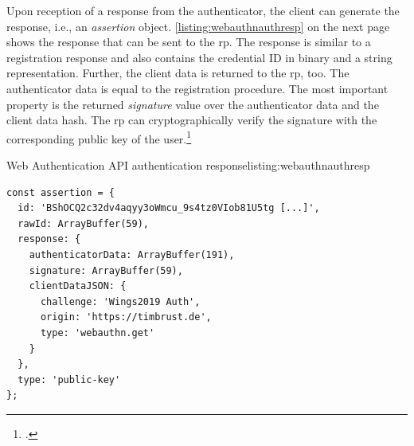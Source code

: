 Upon reception of a response from the authenticator, the client can generate the response, i.e., an \textit{assertion} object. \autoref{listing:webauthnauthresp} on the next page shows the response that can be sent to the \gls{rp}. The response is similar to a registration response and also contains the credential ID in binary and a string representation. Further, the client data is returned to the \gls{rp}, too. The authenticator data is equal to the registration procedure. The most important property is the returned \textit{signature} value over the authenticator data and the client data hash. The \gls{rp} can cryptographically verify the signature with the corresponding public key of the user.\footcites[See][Chapter 5.1.4.1, 5.2.2, 6.3.3]{w3c}
\\
\begin{example}{Web Authentication API authentication response}{listing:webauthnauthresp}
\begin{verbatim}
const assertion = {
  id: 'BShOCQ2c32dv4aqyy3oWmcu_9s4tz0VIob81U5tg [...]',
  rawId: ArrayBuffer(59),
  response: {
    authenticatorData: ArrayBuffer(191),
    signature: ArrayBuffer(59),
    clientDataJSON: {
      challenge: 'Wings2019 Auth',
      origin: 'https://timbrust.de',
      type: 'webauthn.get'
    }
  },
  type: 'public-key'
};
\end{verbatim}
\end{example}
